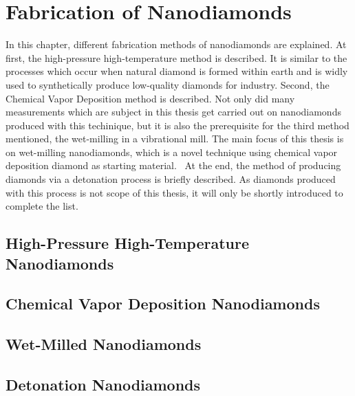 
\chapter{Fabrication of Nanodiamonds}	\label{ch::fabrication_nanodiamonds}

	In this chapter, different fabrication methods of nanodiamonds are explained.
	At first, the high-pressure high-temperature method is described. 
	It is similar to the processes which occur when natural diamond is formed within earth and is widly used to synthetically produce low-quality diamonds for industry.
	Second, the Chemical Vapor Deposition method is described. 
	Not only did many measurements which are subject in this thesis get carried out on nanodiamonds produced with this techinique, but it is also the prerequisite for the third method mentioned, the wet-milling in a vibrational mill.
	The main focus of this thesis is on wet-milling nanodiamonds, which is a novel technique using chemical vapor deposition diamond as starting material. 
	At the end, the method of producing diamonds via a detonation process is briefly described.
	As diamonds produced with this process is not scope of this thesis, it will only be shortly introduced to complete the list.
	

	\section{High-Pressure High-Temperature Nanodiamonds}
	\section{Chemical Vapor Deposition Nanodiamonds}

	
	
	\section{Wet-Milled Nanodiamonds}
	\section{Detonation Nanodiamonds}